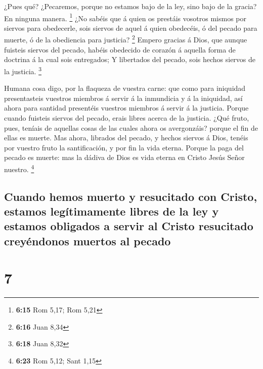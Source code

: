  ¿Pues qué? ¿Pecaremos, porque no estamos bajo de la ley,
sino bajo de la gracia? En ninguna manera. \footnote{\textbf{6:15} Rom
  5,17; Rom 5,21}  ¿No sabéis que á quien os prestáis
vosotros mismos por siervos para obedecerle, sois siervos de aquel á
quien obedecéis, ó del pecado para muerte, ó de la obediencia para
justicia? \footnote{\textbf{6:16} Juan 8,34}  Empero
gracias á Dios, que aunque fuisteis siervos del pecado, habéis obedecido
de corazón á aquella forma de doctrina á la cual sois entregados;
 Y libertados del pecado, sois hechos siervos de la
justicia. \footnote{\textbf{6:18} Juan 8,32}

 Humana cosa digo, por la flaqueza de vuestra carne: que
como para iniquidad presentasteis vuestros miembros á servir á la
inmundicia y á la iniquidad, así ahora para santidad presentéis vuestros
miembros á servir á la justicia.  Porque cuando fuisteis
siervos del pecado, erais libres acerca de la justicia. 
¿Qué fruto, pues, teníais de aquellas cosas de las cuales ahora os
avergonzáis? porque el fin de ellas es muerte.  Mas ahora,
librados del pecado, y hechos siervos á Dios, tenéis por vuestro fruto
la santificación, y por fin la vida eterna.  Porque la paga
del pecado es muerte: mas la dádiva de Dios es vida eterna en Cristo
Jesús Señor nuestro. \footnote{\textbf{6:23} Rom 5,12; Sant 1,15}

\hypertarget{cuando-hemos-muerto-y-resucitado-con-cristo-estamos-leguxedtimamente-libres-de-la-ley-y-estamos-obligados-a-servir-al-cristo-resucitado-creyuxe9ndonos-muertos-al-pecado}{%
\subsection{Cuando hemos muerto y resucitado con Cristo, estamos
legítimamente libres de la ley y estamos obligados a servir al Cristo
resucitado creyéndonos muertos al
pecado}\label{cuando-hemos-muerto-y-resucitado-con-cristo-estamos-leguxedtimamente-libres-de-la-ley-y-estamos-obligados-a-servir-al-cristo-resucitado-creyuxe9ndonos-muertos-al-pecado}}

\hypertarget{section-6}{%
\section{7}\label{section-6}}

